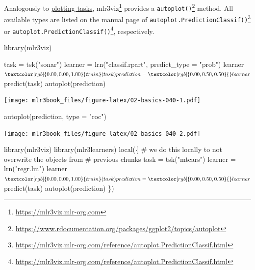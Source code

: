 \documentclass[12pt,]{scrbook}
\newenvironment{Shaded}{}{}
\newcommand{\CommentTok}[1]{\textcolor[rgb]{0.00,0.50,0.00}{#1}}
\newcommand{\DataTypeTok}[1]{#1}
\newcommand{\KeywordTok}[1]{\textcolor[rgb]{0.00,0.00,1.00}{#1}}
\newcommand{\NormalTok}[1]{#1}
\newcommand{\OperatorTok}[1]{#1}
\newcommand{\StringTok}[1]{\textcolor[rgb]{0.00,0.50,0.50}{#1}}
\renewcommand{\href}[2]{#2\footnote{\url{#1}}}
\begin{document}
Analogously to \protect\hyperlink{autoplot-task}{plotting tasks}, \href{https://mlr3viz.mlr-org.com}{mlr3viz} provides a \href{https://www.rdocumentation.org/packages/ggplot2/topics/autoplot}{\texttt{autoplot()}} method.
All available types are listed on the manual page of \href{https://mlr3viz.mlr-org.com/reference/autoplot.PredictionClassif.html}{\texttt{autoplot.PredictionClassif()}} or \href{https://mlr3viz.mlr-org.com/reference/autoplot.PredictionClassif.html}{\texttt{autoplot.PredictionClassif()}}, respectively.

\begin{Shaded}
\begin{Highlighting}[]
\KeywordTok{library}\NormalTok{(mlr3viz)}

\NormalTok{task =}\StringTok{ }\KeywordTok{tsk}\NormalTok{(}\StringTok{"sonar"}\NormalTok{)}
\NormalTok{learner =}\StringTok{ }\KeywordTok{lrn}\NormalTok{(}\StringTok{"classif.rpart"}\NormalTok{, }\DataTypeTok{predict_type =} \StringTok{"prob"}\NormalTok{)}
\NormalTok{learner}\OperatorTok{$}\KeywordTok{train}\NormalTok{(task)}
\NormalTok{prediction =}\StringTok{ }\NormalTok{learner}\OperatorTok{$}\KeywordTok{predict}\NormalTok{(task)}
\KeywordTok{autoplot}\NormalTok{(prediction)}
\end{Highlighting}
\end{Shaded}

\texttt{[image: mlr3book\_files/figure-latex/02-basics-040-1.pdf]}

\begin{Shaded}
\begin{Highlighting}[]
\KeywordTok{autoplot}\NormalTok{(prediction, }\DataTypeTok{type =} \StringTok{"roc"}\NormalTok{)}
\end{Highlighting}
\end{Shaded}

\texttt{[image: mlr3book\_files/figure-latex/02-basics-040-2.pdf]}

\begin{Shaded}
\begin{Highlighting}[]
\KeywordTok{library}\NormalTok{(mlr3viz)}
\KeywordTok{library}\NormalTok{(mlr3learners)}
\KeywordTok{local}\NormalTok{(\{}
  \CommentTok{# we do this locally to not overwrite the objects from}
  \CommentTok{# previous chunks}
\NormalTok{  task =}\StringTok{ }\KeywordTok{tsk}\NormalTok{(}\StringTok{"mtcars"}\NormalTok{)}
\NormalTok{  learner =}\StringTok{ }\KeywordTok{lrn}\NormalTok{(}\StringTok{"regr.lm"}\NormalTok{)}
\NormalTok{  learner}\OperatorTok{$}\KeywordTok{train}\NormalTok{(task)}
\NormalTok{  prediction =}\StringTok{ }\NormalTok{learner}\OperatorTok{$}\KeywordTok{predict}\NormalTok{(task)}
  \KeywordTok{autoplot}\NormalTok{(prediction)}
\NormalTok{\})}
\end{Highlighting}
\end{Shaded}
\end{document}
